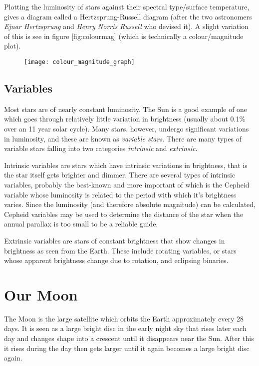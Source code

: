 Plotting the luminosity of stars against their spectral type/surface
temperature, gives a diagram called a Hertzsprung-Russell diagram (after
the two astronomers \emph{Ejnar Hertzsprung} and \emph{Henry Norris
Russell} who devised it). A slight variation of this is see in figure
{[}fig:colourmag{]} (which is technically a colour/magnitude plot).

\begin{figure}[h]
\centering\texttt{[image: colour\_magnitude\_graph]}
\end{figure}

\subsection{Variables}\label{variables}

Most stars are of nearly constant luminosity. The Sun is a good example
of one which goes through relatively little variation in brightness
(usually about 0.1\% over an 11 year solar cycle). Many stars, however,
undergo significant variations in luminosity, and these are known as
\emph{variable stars}. There are many types of variable stars falling
into two categories \emph{intrinsic} and \emph{extrinsic}.

Intrinsic variables are stars which have intrinsic variations in
brightness, that is the star itself gets brighter and dimmer. There are
several types of intrinsic variables, probably the best-known and more
important of which is the Cepheid variable whose luminosity is related
to the period with which it's brightness varies. Since the luminosity
(and therefore absolute magnitude) can be calculated, Cepheid variables
may be used to determine the distance of the star when the annual
parallax is too small to be a reliable guide.

Extrinsic variables are stars of constant brightness that show changes
in brightness as seen from the Earth. These include rotating variables,
or stars whose apparent brightness change due to rotation, and eclipsing
binaries.

\section{Our Moon}\label{our-moon}

The Moon is the large satellite which orbits the Earth approximately
every 28 days. It is seen as a large bright disc in the early night sky
that rises later each day and changes shape into a crescent until it
disappears near the Sun. After this it rises during the day then gets
larger until it again becomes a large bright disc again.

